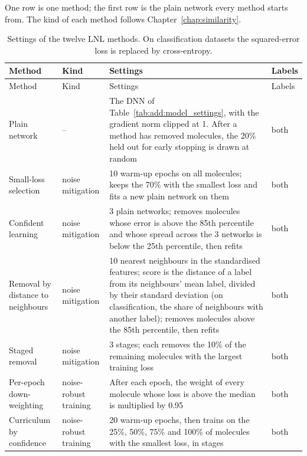 \label{app:add:lnl_settings}
One row is one method; the first row is the plain network every method starts from. The kind of each method follows Chapter~\ref{chap:similarity}.

{\small
\begin{longtable}{@{}p{2.9cm}p{2.0cm}p{7.3cm}p{1.6cm}@{}}
\caption{Settings of the twelve LNL methods. On classification datasets the squared-error loss is replaced by cross-entropy.}
\label{tab:add:lnl_settings}\\
\toprule
Method & Kind & Settings & Labels \\
\midrule
\endfirsthead
\toprule
Method & Kind & Settings & Labels \\
\midrule
\endhead
Plain network & -- & The DNN of Table~\ref{tab:add:model_settings}, with the gradient norm clipped at 1. After a method has removed molecules, the 20\% held out for early stopping is drawn at random & both \\
\midrule
Small-loss selection & noise mitigation & 10 warm-up epochs on all molecules; keeps the 70\% with the smallest loss and fits a new plain network on them & both \\
Confident learning & noise mitigation & 3 plain networks; removes molecules whose error is above the 85th percentile and whose spread across the 3 networks is below the 25th percentile, then refits & both \\
Removal by distance to neighbours & noise mitigation & 10 nearest neighbours in the standardised features; score is the distance of a label from its neighbours' mean label, divided by their standard deviation (on classification, the share of neighbours with another label); removes molecules above the 85th percentile, then refits & both \\
Staged removal & noise mitigation & 3 stages; each removes the 10\% of the remaining molecules with the largest training loss & both \\
\midrule
Per-epoch down-weighting & noise-robust training & After each epoch, the weight of every molecule whose loss is above the median is multiplied by 0.95 & both \\
Curriculum by confidence & noise-robust training & 20 warm-up epochs, then trains on the 25\%, 50\%, 75\% and 100\% of molecules with the smallest loss, in stages & both \\

\end{longtable}}
